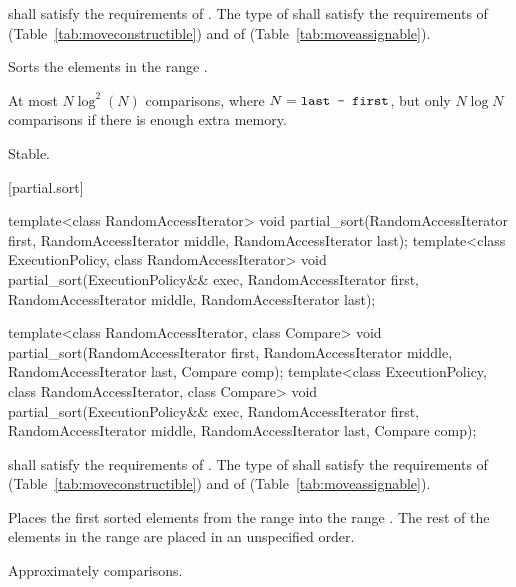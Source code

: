 \begin{itemdescr}
\pnum
\requires
{} shall satisfy the requirements of
. The type
of  shall satisfy the requirements of
 (Table~\ref{tab:moveconstructible}) and of
 (Table~\ref{tab:moveassignable}).

\pnum
\effects
Sorts the elements in the range .

\pnum
\complexity
At most $N \log^2(N)$
comparisons, where
$N = \texttt{last - first}$, but only $N \log N$ comparisons if there is enough extra memory.

\pnum
\remarks Stable.
\end{itemdescr}

[partial.sort]{}

%
\begin{itemdecl}
template<class RandomAccessIterator>
  void partial_sort(RandomAccessIterator first,
                    RandomAccessIterator middle,
                    RandomAccessIterator last);
template<class ExecutionPolicy, class RandomAccessIterator>
  void partial_sort(ExecutionPolicy&& exec,
                    RandomAccessIterator first,
                    RandomAccessIterator middle,
                    RandomAccessIterator last);

template<class RandomAccessIterator, class Compare>
  void partial_sort(RandomAccessIterator first,
                    RandomAccessIterator middle,
                    RandomAccessIterator last,
                    Compare comp);
template<class ExecutionPolicy, class RandomAccessIterator, class Compare>
  void partial_sort(ExecutionPolicy&& exec,
                    RandomAccessIterator first,
                    RandomAccessIterator middle,
                    RandomAccessIterator last,
                    Compare comp);

\end{itemdecl}

\begin{itemdescr}
\pnum
\requires
{} shall satisfy the requirements of
. The type
of  shall satisfy the requirements of
 (Table~\ref{tab:moveconstructible}) and of
 (Table~\ref{tab:moveassignable}).

\pnum
\effects
Places the first
sorted elements from the range
into the range
.
The rest of the elements in the range
are placed in an unspecified order.
%

\pnum
\complexity
Approximately
comparisons.
\end{itemdescr}


